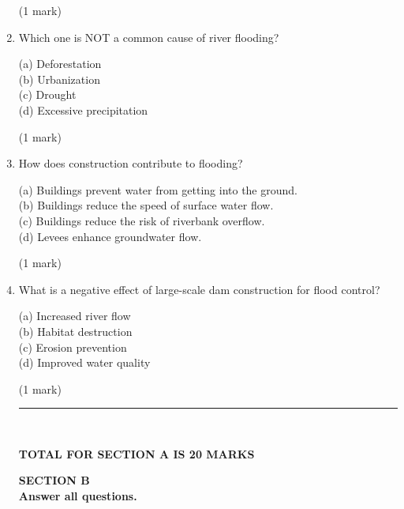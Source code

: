 \documentclass{article}
\begin{document}
\begin{enumerate}
\hfill\raggedright (1 mark) 
\vspace{5pt}
\hline
\vspace{7pt}

\item Which one is NOT a common cause of river flooding?
    
    (a) Deforestation \\
    (b) Urbanization \\
    (c) Drought \\
    (d) Excessive precipitation 

\hfill\raggedright (1 mark) 
\vspace{5pt}
\hline
\vspace{7pt}

    \item How does construction contribute to flooding?
    
    (a) Buildings prevent water from getting into the ground. \\
    (b) Buildings reduce the speed of surface water flow. \\
    (c) Buildings reduce the risk of riverbank overflow. \\
    (d) Levees enhance groundwater flow. 

\hfill\raggedright (1 mark) 
\vspace{5pt}
\hline
\vspace{7pt}

    \item What is a negative effect of large-scale dam construction for flood control?
    
    (a) Increased river flow \\
    (b) Habitat destruction \\
    (c) Erosion prevention \\
    (d) Improved water quality 

\hfill\raggedright (1 mark) 
\vspace{5pt}
\hline
\vspace{7pt}

\vspace{5pt}
\rule{\linewidth}{2pt} \\ 
\hfill\raggedright \textbf{TOTAL FOR SECTION A IS 20 MARKS} 
\vspace{5pt}

\newpage

\begin{center}
\textbf{SECTION B} \\
\vspace{10pt}
\textbf{Answer all questions.}
\end{center}


\end{enumerate}
\end{document}
